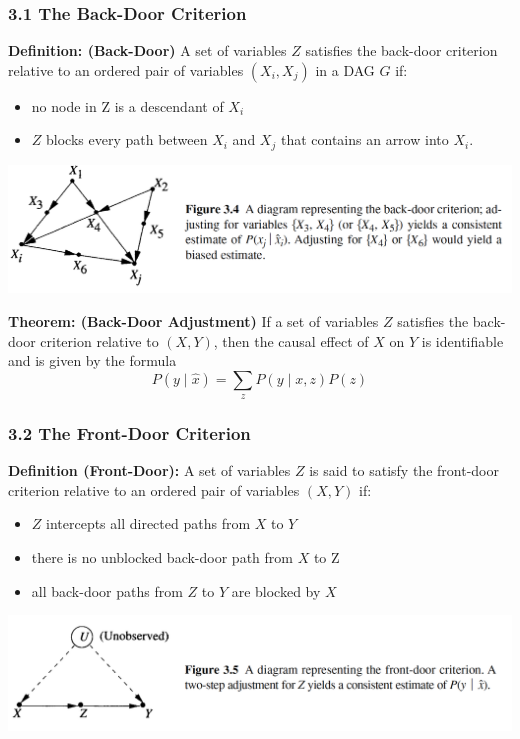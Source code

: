 \documentclass{beamer}
\begin{document}
\begin{frame}
\frametitle{3.1 The Back-Door Criterion}
\vspace{0.3cm}
\textbf{Definition: (Back-Door)} A set of variables $Z$ satisfies the back-door criterion relative to an ordered pair of variables $\left(X_i, X_j\right)$ in a DAG $G$ if:
\begin{itemize}
\item no node in $\mathrm{Z}$ is a descendant of $X_i$
\item $Z$ blocks every path between $X_i$ and $X_j$ that contains an arrow into $X_i$.
\end{itemize}

\vspace{0.4cm}
\includegraphics[scale=0.37]{img/fig_4}
\end{frame}

\begin{frame}
\vspace{0.3cm}
\textbf{Theorem: (Back-Door Adjustment)} If a set of variables $Z$ satisfies the back-door criterion relative to $(X, Y)$, then the causal effect of $X$ on $Y$ is identifiable and is given by the formula
$$
P(y \mid \hat{x})=\sum_z P(y \mid x, z) P(z)
$$
\end{frame}


\begin{frame}
\frametitle{3.2 The Front-Door Criterion}
\textbf{Definition (Front-Door):} A set of variables $Z$ is said to satisfy the front-door criterion relative to an ordered pair of variables $(X, Y)$ if:
\begin{itemize}
\item $Z$ intercepts all directed paths from $X$ to $Y$
\item there is no unblocked back-door path from $X$ to $\mathrm{Z}$
\item all back-door paths from $Z$ to $Y$ are blocked by $X$
\end{itemize}

\vspace{0.4cm}
\includegraphics[scale=0.37]{img/fig_5}
\end{frame}
\end{document}
